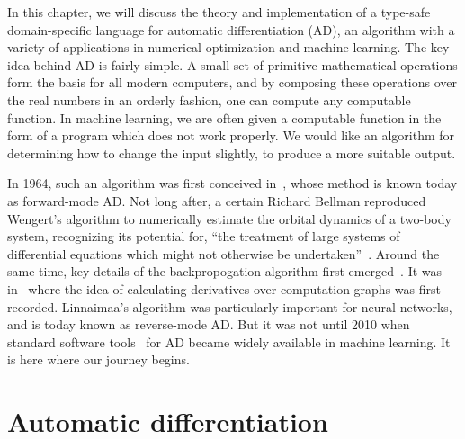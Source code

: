 \documentclass[12pt,initial,twoside,maitrise]{dms}
\numberwithin{equation}{section}
\numberwithin{table}{chapter}
\numberwithin{figure}{chapter}
\begin{document}
In this chapter, we will discuss the theory and implementation of a type-safe domain-specific language for automatic differentiation (AD), an algorithm with a variety of applications in numerical optimization and machine learning. The key idea behind AD is fairly simple. A small set of primitive mathematical operations form the basis for all modern computers, and by composing these operations over the real numbers in an orderly fashion, one can compute any computable function. In machine learning, we are often given a computable function in the form of a program which does not work properly. We would like an algorithm for determining how to change the input slightly, to produce a more suitable output.

In 1964, such an algorithm was first conceived in~\citet{wengert1964simple}, whose method is known today as forward-mode AD. Not long after, a certain Richard Bellman reproduced Wengert's algorithm to numerically estimate the orbital dynamics of a two-body system, recognizing its potential for, ``the treatment of large systems of differential equations which might not otherwise be undertaken''~\citep{bellman1965wengert}. Around the same time, key details of the backpropogation algorithm first emerged~\citep{dreyfus1990artificial}. It was in~\citet{linnainmaa1970representation} where the idea of calculating derivatives over computation graphs was first recorded. Linnaimaa's algorithm was particularly important for neural networks, and is today known as reverse-mode AD. But it was not until 2010 when standard software tools~\citep{bergstra2010theano} for AD became widely available in machine learning. It is here where our journey begins.

\section{Automatic differentiation}\label{sec:automatic-differentiation}
\end{document}
